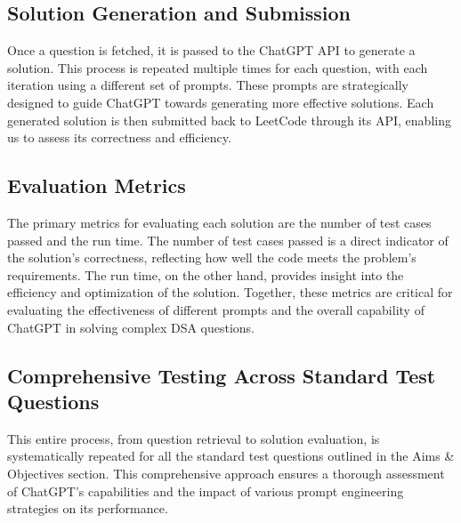 \subsection{Solution Generation and Submission}
\label{sec:intro_some_sub2}
Once a question is fetched, it is passed to the ChatGPT API to generate a solution. This 
process is repeated multiple times for each question, with each iteration using a different set 
of prompts. These prompts are strategically designed to guide ChatGPT towards generating more 
effective solutions. Each generated solution is then submitted back to LeetCode through its 
API, enabling us to assess its correctness and efficiency.

\subsection{Evaluation Metrics}
\label{sec:intro_some_subsub1}
The primary metrics for evaluating each solution are the number of test cases passed and the 
run time. The number of test cases passed is a direct indicator of the solution's correctness, 
reflecting how well the code meets the problem's requirements. The run time, on the other hand, 
provides insight into the efficiency and optimization of the solution. Together, these metrics 
are critical for evaluating the effectiveness of different prompts and the overall capability 
of ChatGPT in solving complex DSA questions.

\subsection{Comprehensive Testing Across Standard Test Questions}
\label{sec:intro_some_subsub2}
This entire process, from question retrieval to solution evaluation, is systematically repeated 
for all the standard test questions outlined in the Aims \& Objectives section. This 
comprehensive approach ensures a thorough assessment of ChatGPT’s capabilities and the impact 
of various prompt engineering strategies on its performance.



